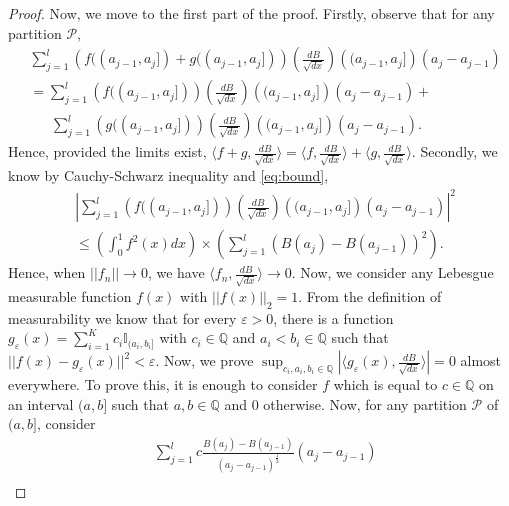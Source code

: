 \documentclass[reqno,12pt]{amsart}
\theoremstyle{plain}
\theoremstyle{definition}
\begin{document}
\begin{proof}
\noindent 
Now, we move to the first part of the proof. Firstly, observe that for any partition $\mathcal{P}$,
\begin{equation}
\begin{split}
&\sum_{j=1}^{l} \left(f((a_{j-1},a_{j}])+g((a_{j-1},a_{j}])\right) \left( \frac{dB}{\sqrt{dx}} \right)\left((a_{j-1},a_{j}]\right)(a_{j}-a_{j-1})\\
&= \sum_{j=1}^{l}\left( f((a_{j-1},a_{j}]) \right)\left( \frac{dB}{\sqrt{dx}} \right)\left((a_{j-1},a_{j}]\right)(a_{j}-a_{j-1})+\\
&~~~~~~~ \sum_{j=1}^{l} \left( g((a_{j-1},a_{j}]) \right)\left( \frac{dB}{\sqrt{dx}} \right)\left((a_{j-1},a_{j}]\right)(a_{j}-a_{j-1}).
\end{split}
\end{equation}
Hence, provided the limits exist, $\langle f+g , \frac{dB}{\sqrt{dx}} \rangle = \langle f,  \frac{dB}{\sqrt{dx}}  \rangle + \langle g, \frac{dB}{\sqrt{dx}}  \rangle$. Secondly, we know by Cauchy-Schwarz inequality and \eqref{eq:bound}, 
\begin{equation}
\begin{split}
&\left|\sum_{j=1}^{l}\left( f((a_{j-1},a_{j}]) \right)\left( \frac{dB}{\sqrt{dx}} \right)\left((a_{j-1},a_{j}]\right)(a_{j}-a_{j-1})\right|^2 \\
& \le \left(\int_{0}^{1} f^{2}(x)dx \right)\times \left( \sum_{j=1}^{l} \left(B(a_{j})-B(a_{j-1})\right)^2 \right).
\end{split}
\end{equation}
Hence, when $||f_{n}|| \to 0 $, we have $\langle f_{n}, \frac{dB}{\sqrt{dx}} \rangle  \to 0$.
Now, we consider any Lebesgue measurable function $f(x)$ with $||f(x)||_{2}=1$. From the definition of measurability we know that for every $\varepsilon >0$, there is a function $g_{\varepsilon}(x)= \sum_{i=1}^{K} c_{i} \mathbb{I}_{(a_{i},b_{i}]}$ 
with $c_{i} \in \mathbb{Q}$ and $a_{i}< b_{i} \in \mathbb{Q}$ such that $|| f(x)- g_{\varepsilon}(x) ||^2 < \varepsilon$. Now, we prove $\sup_{c_{i},a_{i},b_{i} \in \mathbb{Q}}\left|\langle g_{\varepsilon}(x) , \frac{dB}{\sqrt{dx}}\rangle\right|=0$ almost everywhere.
To prove this, it is enough to consider $f$ which is equal to $c \in \mathbb{Q}$ on an interval $(a,b]$ such that $a,b \in \mathbb{Q}$ and $0$ otherwise.
Now, for any partition $\mathcal{P}$ of $(a,b]$, consider
\begin{equation}
\begin{split}
&\sum_{j=1}^{l} c \frac{B(a_{j})-B(a_{j-1})}{\left(a_{j}-a_{j-1}\right)^{\frac{1}{2}}}(a_{j}-a_{j-1})\\

\end{split}
\end{equation}
\end{proof}
\end{document}
